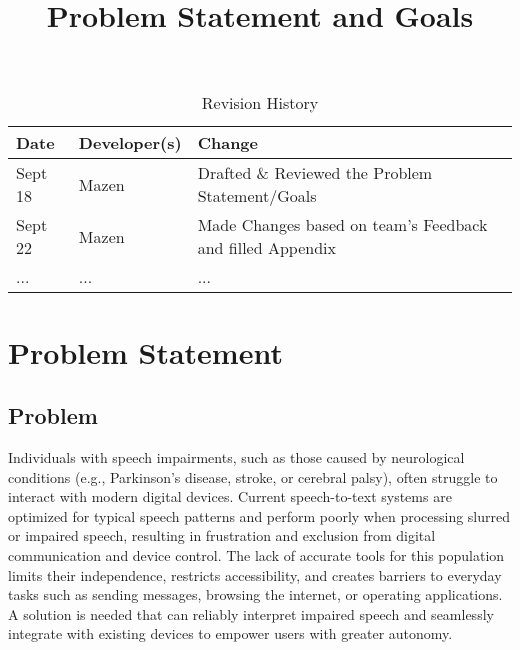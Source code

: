 \documentclass{article}
\title{Problem Statement and Goals\\\progname}
\author{\authname}
\date{}
\begin{document}
\maketitle

\begin{table}[hp]
\caption{Revision History} \label{TblRevisionHistory}
\begin{tabularx}{\textwidth}{llX}
\toprule
\textbf{Date} & \textbf{Developer(s)} & \textbf{Change}\\
\midrule
Sept 18 & Mazen & Drafted \& Reviewed the Problem Statement/Goals\\
Sept 22 & Mazen & Made Changes based on team's Feedback and filled Appendix\\
... & ... & ...\\
\bottomrule
\end{tabularx}
\end{table}

\section{Problem Statement}



\subsection{Problem}
Individuals with speech impairments, such as those caused by neurological conditions (e.g., Parkinson's disease, stroke, or cerebral palsy), often struggle to interact with modern digital devices. Current speech-to-text systems are optimized for typical speech patterns and perform poorly when processing slurred or impaired speech, resulting in frustration and exclusion from digital communication and device control. The lack of accurate tools for this population limits their independence, restricts accessibility, and creates barriers to everyday tasks such as sending messages, browsing the internet, or operating applications. A solution is needed that can reliably interpret impaired speech and seamlessly integrate with existing devices to empower users with greater autonomy.
\end{document}
